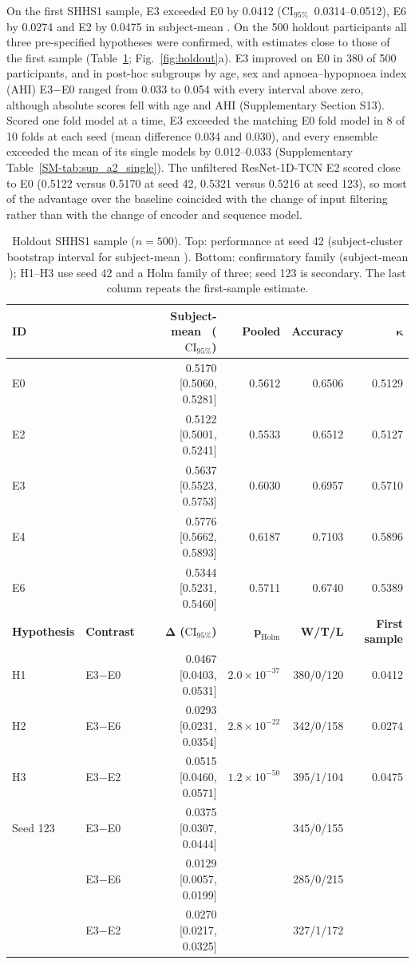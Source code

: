 \documentclass[11pt,a4paper]{article}
\newcommand{\mf}{\text{macro-F1}}
\newcommand{\ci}{\ensuremath{\mathrm{CI}_{95\%}}}
\begin{document}
On the first SHHS1 sample, E3 exceeded E0 by 0.0412 (\ci\ 0.0314--0.0512), E6 by 0.0274 and E2 by
0.0475 in subject-mean \mf. On the 500 holdout participants all three pre-specified hypotheses were
confirmed, with estimates close to those of the first sample (Table~\ref{tab:holdout};
Fig.~\ref{fig:holdout}a). E3 improved on E0 in 380 of 500 participants, and in post-hoc subgroups by
age, sex and apnoea--hypopnoea index (AHI) E3$-$E0 ranged from 0.033 to 0.054 with every interval above
zero, although absolute scores fell with age and AHI (Supplementary Section S13). Scored one fold model at a
time, E3 exceeded the matching E0 fold model in 8 of 10 folds at each seed (mean difference 0.034 and 0.030),
and every ensemble exceeded the mean of its single models by 0.012--0.033 (Supplementary
Table~\ref{SM-tab:sup_a2_single}). The unfiltered ResNet-1D-TCN
E2 scored close to E0 (0.5122 versus 0.5170 at seed 42, 0.5321 versus 0.5216 at seed 123), so most of
the advantage over the baseline coincided with the change of input filtering rather than with the
change of encoder and sequence model.

\begin{table}[t]
\centering
\caption{Holdout SHHS1 sample ($n=500$). Top: performance at seed 42 (subject-cluster bootstrap
interval for subject-mean \mf). Bottom: confirmatory family (subject-mean \mf); H1--H3 use seed 42
and a Holm family of three; seed 123 is secondary. The last column repeats the first-sample estimate.}
\label{tab:holdout}
\small
\begin{tabular}{llrrrr}
\toprule
\textbf{ID} & & \textbf{Subject-mean \mf\ (\ci)} & \textbf{Pooled \mf} & \textbf{Accuracy} & $\boldsymbol{\kappa}$ \\
\midrule
E0 & & 0.5170 [0.5060, 0.5281] & 0.5612 & 0.6506 & 0.5129 \\
E2 & & 0.5122 [0.5001, 0.5241] & 0.5533 & 0.6512 & 0.5127 \\
E3 & & 0.5637 [0.5523, 0.5753] & 0.6030 & 0.6957 & 0.5710 \\
E4 & & 0.5776 [0.5662, 0.5893] & 0.6187 & 0.7103 & 0.5896 \\
E6 & & 0.5344 [0.5231, 0.5460] & 0.5711 & 0.6740 & 0.5389 \\
\midrule
\textbf{Hypothesis} & \textbf{Contrast} & $\boldsymbol{\Delta}$ \textbf{(\ci)} & $\boldsymbol{p_{\mathrm{Holm}}}$ & \textbf{W/T/L} & \textbf{First sample} \\
\midrule
H1 & E3$-$E0 & 0.0467 [0.0403, 0.0531] & $2.0\times10^{-37}$ & 380/0/120 & 0.0412 \\
H2 & E3$-$E6 & 0.0293 [0.0231, 0.0354] & $2.8\times10^{-22}$ & 342/0/158 & 0.0274 \\
H3 & E3$-$E2 & 0.0515 [0.0460, 0.0571] & $1.2\times10^{-50}$ & 395/1/104 & 0.0475 \\
Seed 123 & E3$-$E0 & 0.0375 [0.0307, 0.0444] & & 345/0/155 & \\
 & E3$-$E6 & 0.0129 [0.0057, 0.0199] & & 285/0/215 & \\
 & E3$-$E2 & 0.0270 [0.0217, 0.0325] & & 327/1/172 & \\
\bottomrule
\end{tabular}
\end{table}
\end{document}
